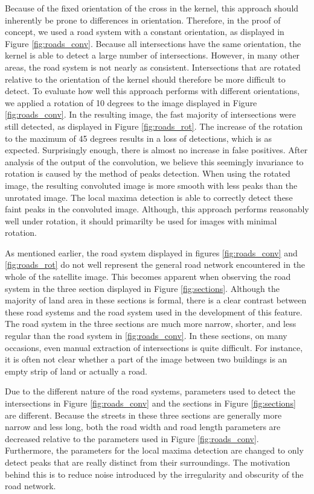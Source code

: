 Because of the fixed orientation of the cross in the kernel, this approach
should inherently be prone to differences in orientation. Therefore, in the
proof of concept, we used a road system with a constant orientation, as
displayed in Figure \ref{fig:roads_conv}. Because all intersections have the
same orientation, the kernel is able to detect a large number of intersections.
However, in many other areas, the road system is not nearly as consistent.
Intersections that are rotated relative to the orientation of the kernel should
therefore be more difficult to detect. To evaluate how well this approach performs with different orientations, we
applied a rotation of 10 degrees to the image displayed in Figure
\ref{fig:roads_conv}. In the resulting image, the fast majority of
intersections were still detected, as displayed in Figure \ref{fig:roads_rot}.
The increase of the rotation to the maximum of 45 degrees results in a loss of
detections, which is as expected. Surprisingly enough, there is almost no
increase in false positives. After analysis of the output of the convolution, we believe this seemingly
invariance to rotation is caused by the method of peaks detection.  When using
the rotated image, the resulting convoluted image is more smooth with less
peaks than the unrotated image. The local maxima detection is able to
correctly detect these faint peaks in the convoluted image. Although, this approach performs reasonably well under rotation, it should primarilty be used for images with minimal rotation.\newline

\noindent
As mentioned earlier, the road system displayed in figures \ref{fig:roads_conv} and \ref{fig:roads_rot} do not well represent the general road network encountered in the whole of the satellite image. This becomes apparent when observing the road system in the three section displayed in Figure \ref{fig:sections}. Although the majority of land area in these sections is formal, there is a clear contrast between these road systems and the road system used in the development of this feature. The road system in the three sections are much more narrow, shorter, and less regular than the road system in \ref{fig:roads_conv}. In these sections, on many occasions, even manual extraction of intersections is quite difficult. For instance, it is often not clear whether a part of the image between two buildings is an empty strip of land or actually a road. 

Due to the different nature of the road systems, parameters used to detect the intersections in Figure \ref{fig:roads_conv} and the sections in Figure \ref{fig:sections} are different. Because the streets in these three sections are generally more narrow and less long, both the road width and road length parameters are decreased relative to the parameters used in Figure \ref{fig:roads_conv}. Furthermore, the parameters for the local maxima detection are changed to only detect peaks that are really distinct from their surroundings. The motivation behind this is to reduce noise introduced by the irregularity and obscurity of the road network.

